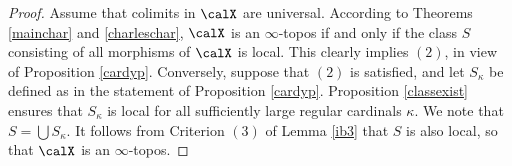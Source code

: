 \begin{proof}
Assume that colimits in $\calX$ are universal. According to Theorems \ref{mainchar} and \ref{charleschar}, $\calX$ is an $\infty$-topos if and only if the class $S$ consisting of all morphisms of $\calX$ is local. This clearly implies $(2)$, in view of Proposition \ref{cardyp}. Conversely,
suppose that $(2)$ is satisfied, and let $S_{\kappa}$ be defined as in the statement of Proposition \ref{cardyp}. Proposition \ref{classexist} ensures that $S_{\kappa}$ is local for all sufficiently large regular cardinals $\kappa$. We note that $S = \bigcup S_{\kappa}$. It follows from Criterion $(3)$ of Lemma \ref{ib3} that $S$ is also local, so that $\calX$ is an $\infty$-topos.
\end{proof}